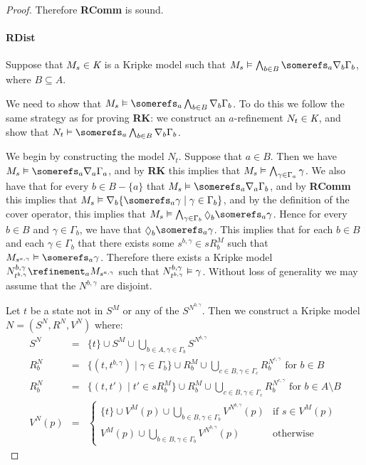 \begin{proof}
Therefore {\bf RComm} is sound.

\paragraph{RDist}
Suppose that $M_s \in \textit{K}$ is a Kripke model such that $M_s \entails
\bigwedge_{b \in B} \somerefs_a \covers_b \Gamma_b$, where $B \subseteq A$.

We need to show that $M_s \entails \somerefs_a \bigwedge_{b \in B} \covers_b
\Gamma_b$. To do this we follow the same strategy as for proving {\bf RK}: we
construct an $a$-refinement $N_t \in \textit{K}$, and show that $N_t \entails
\somerefs_a \bigwedge_{b \in B} \covers_b \Gamma_b$.

We begin by constructing the model $N_t$. Suppose that $a \in B$. Then we have
$M_s \entails \somerefs_a \covers_a \Gamma_a$, and by {\bf RK} this implies that
$M_s \vDash \bigwedge_{\gamma \in \Gamma_a} \gamma$. We also have that for
every $b \in B - \{a\}$ that $M_s \entails \somerefs_a \covers_a \Gamma_b$, and
by {\bf RComm} this implies that $M_s \entails \covers_b \{\somerefs_a \gamma
\mid \gamma \in \Gamma_b\}$, and by the definition of the cover operator, this
implies that $M_s \entails \bigwedge_{\gamma \in \Gamma_b} \suspects_b
\somerefs_a \gamma$. Hence for every $b \in B$ and $\gamma \in \Gamma_b$, we
have that $\suspects_b \somerefs_a \gamma$. This implies that for each $b \in B$
and each $\gamma \in \Gamma_b$ that there exists some $s^{b,\gamma} \in sR^M_b$ such
that $M_{s^{a,\gamma}} \entails \somerefs_a \gamma$. Therefore there exists a Kripke
model $N^{b,\gamma}_{t^{b,\gamma}} \refinement_a M_{s^{a,\gamma}}$ such that
$N^{b,\gamma}_{t^{b,\gamma}} \vDash \gamma$. Without loss of generality we
may assume that the $N^{b,\gamma}$ are disjoint.

Let $t$ be a state not in $S^M$ or any of the $S^{N^{b,\gamma}}$. Then we construct a
Kripke model $N = (S^N, R^N, V^N)$ where:
\begin{eqnarray*}
S^N &=& \{t\} \cup S^M \cup \bigcup_{b \in A, \gamma \in \Gamma_b} S^{N^{b,\gamma}}\\
R^N_b &=& \{(t, t^{b,\gamma}) \mid \gamma \in \Gamma_b\} \cup R^M_b \cup
\bigcup_{c \in B, \gamma \in \Gamma_c} R^{N^{c,\gamma}}_b \text{ for $b \in
B$}\\
R^N_b &=& \{(t, t') \mid t' \in sR^M_b\} \cup R^M_b \cup
\bigcup_{c \in B, \gamma \in \Gamma_c} R^{N^{c,\gamma}}_b \text{ for $b \in A
\setminus B$}\\
V^N(p) &=& 
\begin{cases}
\displaystyle \{t\} \cup V^M(p) \cup \bigcup_{b \in B, \gamma \in \Gamma_b}
V^{N^{b,\gamma}}(p) & \text{if $s \in V^M(p)$}\\
\displaystyle V^M(p) \cup \bigcup_{b \in B, \gamma \in \Gamma_b}
V^{N^{b,\gamma}}(p) & \text{otherwise}
\end{cases}
\end{eqnarray*}


\end{proof}
